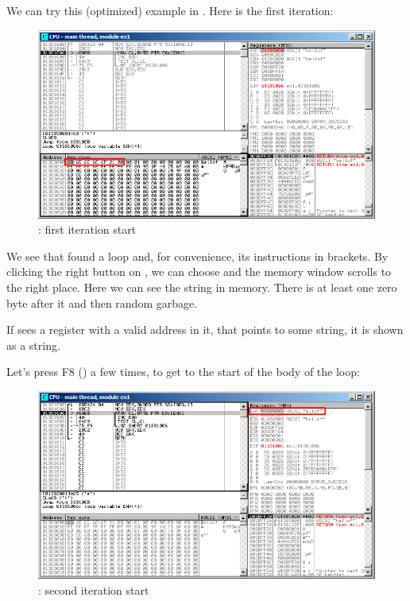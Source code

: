 ﻿\clearpage
{}
\myindex{\olly}

We can try this (optimized) example in \olly.  Here is the first iteration:

\begin{figure}[H]
\centering
\includegraphics[scale=\FigScale]{patterns/10_strings/1_strlen/olly1.png}
\caption{\olly: first iteration start}
\label{fig:strlen_olly_1}
\end{figure}

We see that \olly found a loop and, for convenience,  its instructions in brackets.
By clicking the right button on \EAX, we can choose 
 and the memory window scrolls to the right place.
Here we can see the string  in memory.
There is at least
one zero byte after it and then random garbage.

If \olly sees a register with a valid address in it, that points to some string, 
it is shown as a string.

\clearpage
Let's press F8 (\stepover) a few times, to get to the start of the body of the loop:

\begin{figure}[H]
\centering
\includegraphics[scale=\FigScale]{patterns/10_strings/1_strlen/olly2.png}
\caption{\olly: second iteration start}
\label{fig:strlen_olly_2}
\end{figure}

